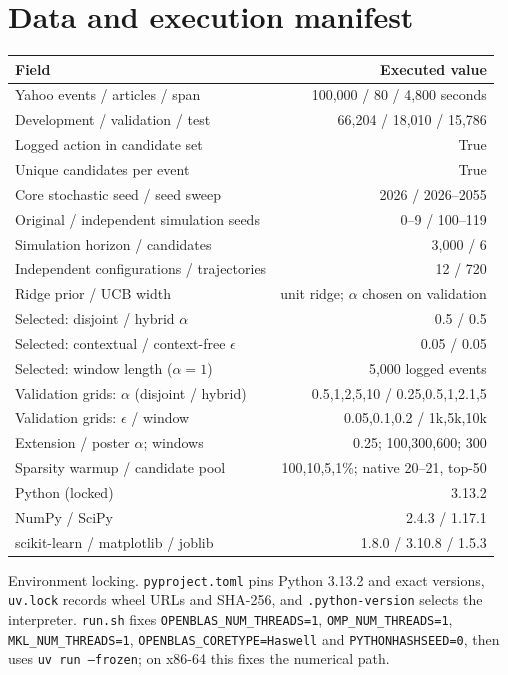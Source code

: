 \documentclass[10pt,a4paper]{article}
\begin{document}
\section{Data and execution manifest}
\begin{center}\small\begin{tabular}{lr}
\toprule
Field & Executed value \\ \midrule
Yahoo events / articles / span & 100,000 / 80 / 4,800 seconds \\
Development / validation / test & 66,204 / 18,010 / 15,786 \\
Logged action in candidate set & True \\
Unique candidates per event & True \\
Core stochastic seed / seed sweep & 2026 / 2026--2055 \\
Original / independent simulation seeds & 0--9 / 100--119 \\
Simulation horizon / candidates & 3,000 / 6 \\
Independent configurations / trajectories & 12 / 720 \\
Ridge prior / UCB width & unit ridge; $\alpha$ chosen on validation \\
Selected: disjoint / hybrid $\alpha$ & 0.5 / 0.5 \\
Selected: contextual / context-free $\epsilon$ & 0.05 / 0.05 \\
Selected: window length ($\alpha=1$) & 5,000 logged events \\
Validation grids: $\alpha$ (disjoint / hybrid) & 0.5,1,2,5,10 / 0.25,0.5,1,2.1,5 \\
Validation grids: $\epsilon$ / window & 0.05,0.1,0.2 / 1k,5k,10k \\
Extension / poster $\alpha$; windows & 0.25; 100,300,600; 300 \\
Sparsity warmup / candidate pool & 100,10,5,1\%; native 20--21, top-50 \\
Python (locked) & 3.13.2 \\
NumPy / SciPy & 2.4.3 / 1.17.1 \\
scikit-learn / matplotlib / joblib & 1.8.0 / 3.10.8 / 1.5.3 \\
\bottomrule\end{tabular}\end{center}

\noindent Environment locking. \texttt{pyproject.toml} pins Python 3.13.2
and exact versions, \texttt{uv.lock} records wheel URLs and SHA-256, and
\texttt{.python-version} selects the interpreter. \texttt{run.sh} fixes
\texttt{OPENBLAS\_NUM\_THREADS=1}, \texttt{OMP\_NUM\_THREADS=1},
\texttt{MKL\_NUM\_THREADS=1}, \texttt{OPENBLAS\_CORETYPE=Haswell} and
\texttt{PYTHONHASHSEED=0}, then uses \texttt{uv run --frozen}; on x86-64
this fixes the numerical path.
\end{document}
